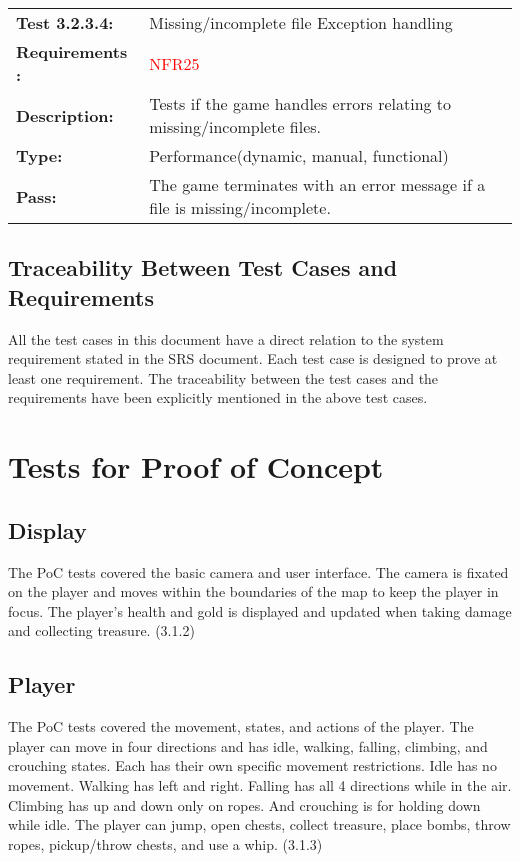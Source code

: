 \documentclass[12pt, titlepage]{article}
\begin{document}
\begin{tabular}{|l|p{10cm}|}
    \hline
    \bf{Test} 3.2.3.4: & Missing/incomplete file Exception handling\\
    \bf{Requirements} : & \textcolor{red}{NFR25} \\
    \bf{Description}: & Tests if the game handles errors relating to missing/incomplete files. \\
    \bf{Type}: & Performance(dynamic, manual, functional) \\
    \bf{Pass}: & The game terminates with an error message if a file is missing/incomplete. \\
    \hline
\end{tabular}
		
\subsection{Traceability Between Test Cases and Requirements}

All the test cases in this document have a direct relation to the system requirement stated in the SRS document. Each test case is designed to prove at least one requirement. The traceability between the test cases and the requirements have been explicitly mentioned in the above test cases. 

\section{Tests for Proof of Concept}

\subsection{Display}
The PoC tests covered the basic camera and user interface. The camera is fixated on the player and moves within the boundaries of the map to keep the player in focus. The player's health and gold is displayed and updated when taking damage and collecting treasure. (3.1.2)

\subsection{Player}
The PoC tests covered the movement, states, and actions of the player. The player can move in four directions and has idle, walking, falling, climbing, and crouching states. Each has their own specific movement restrictions. Idle has no movement. Walking has left and right. Falling has all 4 directions while in the air. Climbing has up and down only on ropes. And crouching is for holding down while idle. The player can jump, open chests, collect treasure, place bombs, throw ropes, pickup/throw chests, and use a whip. (3.1.3)
\end{document}
